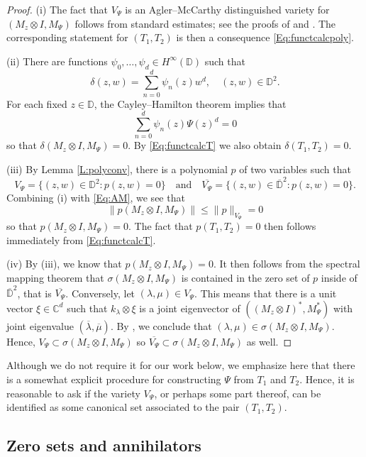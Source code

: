 \documentclass[10pt]{amsart}
\newcommand{\bC}{{\mathbb{C}}}
\newcommand{\bD}{{\mathbb{D}}}
\newcommand{\ol}{\overline}
\newcommand{\qand}{\quad\text{and}\quad}
\theoremstyle{definition}
\begin{document}
\begin{proof}
(i) The fact that  $V_\Psi$ is an Agler--McCarthy distinguished variety for $(M_z\otimes I,M_\Psi)$ follows from standard estimates; see the proofs of \cite[Theorem 3.1]{AM2005} and \cite[Theorem 4.3]{DS2017}. The corresponding statement for $(T_1,T_2)$ is then a consequence \eqref{Eq:functcalcpoly}.

(ii) There are functions $\psi_0,\ldots,\psi_d\in H^\infty(\bD)$ such that
\[
\delta(z,w)=\sum_{n=0}^d \psi_n(z)w^d, \quad (z,w)\in \bD^2.
\]
For each fixed $z\in \bD$, the Cayley--Hamilton theorem implies that
\[
\sum_{n=0}^d \psi_n(z)\Psi(z)^d=0
\]
so that $\delta(M_z\otimes I, M_\Psi)=0$. By \eqref{Eq:functcalcT} we also obtain $\delta(T_1,T_2)=0$.

(iii) By Lemma \ref{L:polyconv}, there is a polynomial $p$ of two variables such that
\[
V_\Psi=\{(z,w)\in \bD^2:p(z,w)=0\} \qand \ol{V_\Psi}=\{(z,w)\in \ol{\bD}^2: p(z,w)=0\}.
\]
Combining (i) with \eqref{Eq:AM}, we see that 
\[
\|p(M_z\otimes I, M_\Psi)\|\leq \|p\|_{V_\Psi}=0
\]
so that $p(M_z\otimes I, M_\Psi)=0$. The fact that $p(T_1,T_2)=0$ then follows immediately from \eqref{Eq:functcalcT}.


(iv)  By (iii), we know that $p(M_z\otimes I,M_\Psi)=0$. It then follows from the spectral mapping theorem \cite[Theorem 7.7]{muller2007} that $\sigma(M_z\otimes I,M_\Psi)$ is contained in the zero set of $p$ inside of $\ol{\bD}^2$, that is $\ol{V_\Psi}$. Conversely, let $(\lambda,\mu)\in V_\Psi$. This means that there is a unit vector $\xi\in \bC^d$ such that $k_\lambda\otimes \xi$ is a joint eigenvector of $((M_z\otimes I)^*,M^*_\Psi)$ with joint eigenvalue $(\ol{\lambda},\ol{\mu})$. By  \cite[Corollary 9.14 and Remark 25.2]{muller2007}, we conclude that $(\lambda,\mu)\in \sigma(M_z\otimes I,M_\Psi)$. Hence, $V_\Psi\subset \sigma(M_z\otimes I,M_\Psi)$ so $\ol{V_\Psi}\subset \sigma(M_z\otimes I,M_\Psi)$ as well.
\end{proof}

Although we do not require it for our work below, we emphasize here that there is a somewhat explicit procedure for constructing $\Psi$ from $T_1$ and $T_2$. Hence, it is reasonable to ask if the variety $V_\Psi$, or perhaps some part thereof, can be identified as some canonical set associated to the pair $(T_1,T_2)$.





\subsection{Zero sets and annihilators}
\end{document}
